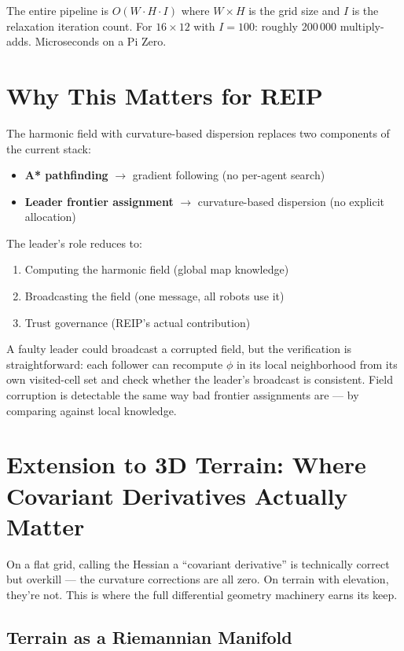 \documentclass[11pt]{article}
\begin{document}
The entire pipeline is $O(W \cdot H \cdot I)$ where $W \times H$
is the grid size and $I$ is the relaxation iteration count.  For
$16 \times 12$ with $I = 100$: roughly 200\,000 multiply-adds.
Microseconds on a Pi Zero.

\section{Why This Matters for REIP}

The harmonic field with curvature-based dispersion replaces two
components of the current stack:
\begin{itemize}
    \item \textbf{A* pathfinding} $\to$ gradient following (no
    per-agent search)
    \item \textbf{Leader frontier assignment} $\to$ curvature-based
    dispersion (no explicit allocation)
\end{itemize}

The leader's role reduces to:
\begin{enumerate}
    \item Computing the harmonic field (global map knowledge)
    \item Broadcasting the field (one message, all robots use it)
    \item Trust governance (REIP's actual contribution)
\end{enumerate}

A faulty leader could broadcast a corrupted field, but the
verification is straightforward: each follower can recompute
$\phi$ in its local neighborhood from its own visited-cell set
and check whether the leader's broadcast is consistent.  Field
corruption is detectable the same way bad frontier assignments
are --- by comparing against local knowledge.

\section{Extension to 3D Terrain: Where Covariant Derivatives
Actually Matter}

On a flat grid, calling the Hessian a ``covariant derivative'' is
technically correct but overkill --- the curvature corrections are
all zero.  On terrain with elevation, they're not.  This is where
the full differential geometry machinery earns its keep.

\subsection{Terrain as a Riemannian Manifold}
\end{document}
